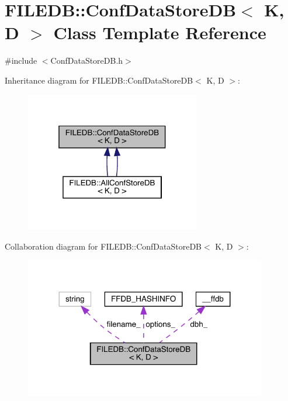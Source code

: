\hypertarget{classFILEDB_1_1ConfDataStoreDB}{}\section{F\+I\+L\+E\+DB\+:\+:Conf\+Data\+Store\+DB$<$ K, D $>$ Class Template Reference}
\label{classFILEDB_1_1ConfDataStoreDB}


{\ttfamily \#include $<$Conf\+Data\+Store\+D\+B.\+h$>$}



Inheritance diagram for F\+I\+L\+E\+DB\+:\+:Conf\+Data\+Store\+DB$<$ K, D $>$\+:\nopagebreak
\begin{figure}[H]
\begin{center}
\leavevmode
\includegraphics[width=217pt]{d4/d76/classFILEDB_1_1ConfDataStoreDB__inherit__graph}
\end{center}
\end{figure}


Collaboration diagram for F\+I\+L\+E\+DB\+:\+:Conf\+Data\+Store\+DB$<$ K, D $>$\+:\nopagebreak
\begin{figure}[H]
\begin{center}
\leavevmode
\includegraphics[width=299pt]{d0/d41/classFILEDB_1_1ConfDataStoreDB__coll__graph}
\end{center}
\end{figure}
